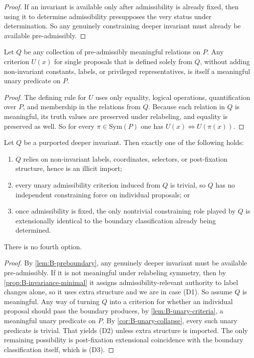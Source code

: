 \begin{proof}
If an invariant is available only after admissibility is already fixed, then using it to determine admissibility presupposes the very status under determination. So any genuinely constraining deeper invariant must already be available pre-admissibly.
\end{proof}

\begin{lemma}
\label{lem:B-unary-criteria}
Let $Q$ be any collection of pre-admissibly meaningful relations on $P$. Any criterion $U(x)$ for single proposals that is defined solely from $Q$, without adding non-invariant constants, labels, or privileged representatives, is itself a meaningful unary predicate on $P$.
\end{lemma}

\begin{proof}
The defining rule for $U$ uses only equality, logical operations, quantification over $P$, and membership in the relations from $Q$. Because each relation in $Q$ is meaningful, its truth values are preserved under relabeling, and equality is preserved as well. So for every $\pi\in\mathrm{Sym}(P)$ one has $U(x)\Leftrightarrow U(\pi(x))$.
\end{proof}

\begin{theorem}
\label{thm:B-no-deeper-invariant}
Let $Q$ be a purported deeper invariant. Then exactly one of the following holds:
\begin{enumerate}[label=(D\arabic*), leftmargin=2.8em]
    \item $Q$ relies on non-invariant labels, coordinates, selectors, or post-fixation structure, hence is an illicit import;
    \item every unary admissibility criterion induced from $Q$ is trivial, so $Q$ has no independent constraining force on individual proposals; or
    \item once admissibility is fixed, the only nontrivial constraining role played by $Q$ is extensionally identical to the boundary classification already being determined.
\end{enumerate}
There is no fourth option.
\end{theorem}

\begin{proof}
By \cref{lem:B-preboundary}, any genuinely deeper invariant must be available pre-admissibly. If it is not meaningful under relabeling symmetry, then by \cref{prop:B-invariance-minimal} it assigns admissibility-relevant authority to label changes alone, so it uses extra structure and we are in case (D1). So assume $Q$ is meaningful. Any way of turning $Q$ into a criterion for whether an individual proposal should pass the boundary produces, by \cref{lem:B-unary-criteria}, a meaningful unary predicate on $P$. By \cref{cor:B-unary-collapse}, every such unary predicate is trivial. That yields (D2) unless extra structure is imported. The only remaining possibility is post-fixation extensional coincidence with the boundary classification itself, which is (D3).
\end{proof}

